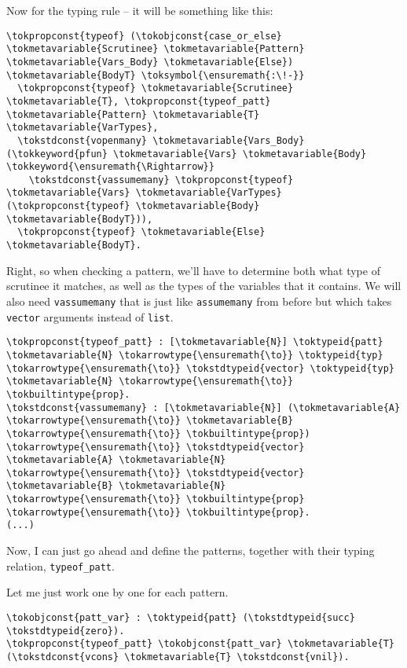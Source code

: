 Now for the typing rule -- it will be something like this:

\begin{verbatim}
\tokpropconst{typeof} (\tokobjconst{case_or_else} \tokmetavariable{Scrutinee} \tokmetavariable{Pattern} \tokmetavariable{Vars_Body} \tokmetavariable{Else}) \tokmetavariable{BodyT} \toksymbol{\ensuremath{:\!-}}
  \tokpropconst{typeof} \tokmetavariable{Scrutinee} \tokmetavariable{T}, \tokpropconst{typeof_patt} \tokmetavariable{Pattern} \tokmetavariable{T} \tokmetavariable{VarTypes},
  \tokstdconst{vopenmany} \tokmetavariable{Vars_Body} (\tokkeyword{pfun} \tokmetavariable{Vars} \tokmetavariable{Body} \tokkeyword{\ensuremath{\Rightarrow}}
    \tokstdconst{vassumemany} \tokpropconst{typeof} \tokmetavariable{Vars} \tokmetavariable{VarTypes} (\tokpropconst{typeof} \tokmetavariable{Body} \tokmetavariable{BodyT})),
  \tokpropconst{typeof} \tokmetavariable{Else} \tokmetavariable{BodyT}.
\end{verbatim}

Right, so when checking a pattern, we'll have to determine both what
type of scrutinee it matches, as well as the types of the variables that
it contains. We will also need \texttt{vassumemany} that is just like
\texttt{assumemany} from before but which takes \texttt{vector}
arguments instead of \texttt{list}.

\begin{verbatim}
\tokpropconst{typeof_patt} : [\tokmetavariable{N}] \toktypeid{patt} \tokmetavariable{N} \tokarrowtype{\ensuremath{\to}} \toktypeid{typ} \tokarrowtype{\ensuremath{\to}} \tokstdtypeid{vector} \toktypeid{typ} \tokmetavariable{N} \tokarrowtype{\ensuremath{\to}} \tokbuiltintype{prop}.
\tokstdconst{vassumemany} : [\tokmetavariable{N}] (\tokmetavariable{A} \tokarrowtype{\ensuremath{\to}} \tokmetavariable{B} \tokarrowtype{\ensuremath{\to}} \tokbuiltintype{prop}) \tokarrowtype{\ensuremath{\to}} \tokstdtypeid{vector} \tokmetavariable{A} \tokmetavariable{N} \tokarrowtype{\ensuremath{\to}} \tokstdtypeid{vector} \tokmetavariable{B} \tokmetavariable{N} \tokarrowtype{\ensuremath{\to}} \tokbuiltintype{prop} \tokarrowtype{\ensuremath{\to}} \tokbuiltintype{prop}.
(...)
\end{verbatim}

Now, I can just go ahead and define the patterns, together with their
typing relation, \texttt{typeof\_patt}.

Let me just work one by one for each pattern.

\begin{verbatim}
\tokobjconst{patt_var} : \toktypeid{patt} (\tokstdtypeid{succ} \tokstdtypeid{zero}).
\tokpropconst{typeof_patt} \tokobjconst{patt_var} \tokmetavariable{T} (\tokstdconst{vcons} \tokmetavariable{T} \tokstdconst{vnil}).
\end{verbatim}

